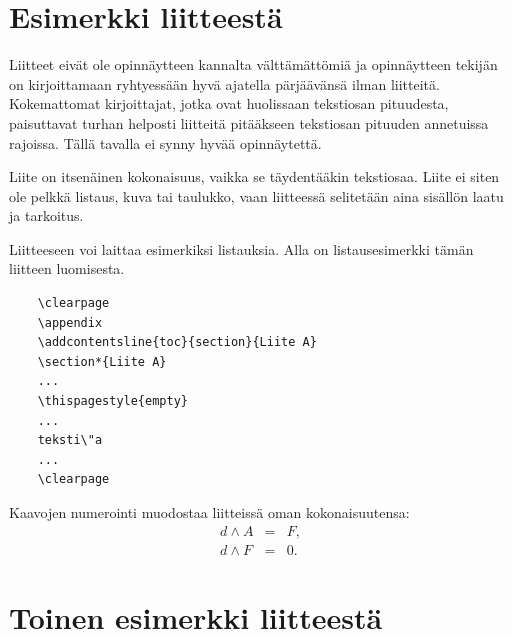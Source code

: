 \documentclass[english,12pt,a4paper,pdftex,elec,utf8]{aaltothesis}
\begin{document}
\clearpage

\thesisappendix

\section{Esimerkki liitteest\"a\label{LiiteA}}

Liitteet eiv\"at ole opinn\"aytteen kannalta v\"altt\"am\"att\"omi\"a ja 
opinn\"aytteen tekij\"an on 
kirjoittamaan ryhtyess\"a\"an hyv\"a ajatella p\"arj\"a\"av\"ans\"a ilman liitteit\"a.
Kokemattomat kirjoittajat, jotka ovat huolissaan
tekstiosan pituudesta, paisuttavat turhan 
helposti liitteit\"a pit\"a\"akseen tekstiosan pituuden annetuissa rajoissa.
T\"all\"a tavalla ei synny hyv\"a\"a opinn\"aytett\"a.   

Liite on itsen\"ainen kokonaisuus, vaikka se t\"aydent\"a\"akin tekstiosaa.
Liite ei siten ole pelkk\"a listaus, kuva tai taulukko, vaan 
liitteess\"a selitet\"a\"an aina sis\"all\"on laatu ja tarkoitus. 

Liitteeseen voi laittaa esimerkiksi listauksia. Alla on 
listausesimerkki t\"am\"an liitteen luomisesta. 

\begin{verbatim}
	\clearpage
	\appendix
	\addcontentsline{toc}{section}{Liite A}
	\section*{Liite A}
	...
	\thispagestyle{empty}
	...
	teksti\"a
	...
	\clearpage
\end{verbatim}

Kaavojen numerointi muodostaa liitteiss\"a oman kokonaisuutensa:
\begin{eqnarray}
d \wedge A  &=& F, \label{liitekaava1}\\
d \wedge F  &=& 0. \label{liitekaava2}
\end{eqnarray}


\clearpage
\section{Toinen esimerkki liitteest\"a\label{LiiteB}}

\end{document}
